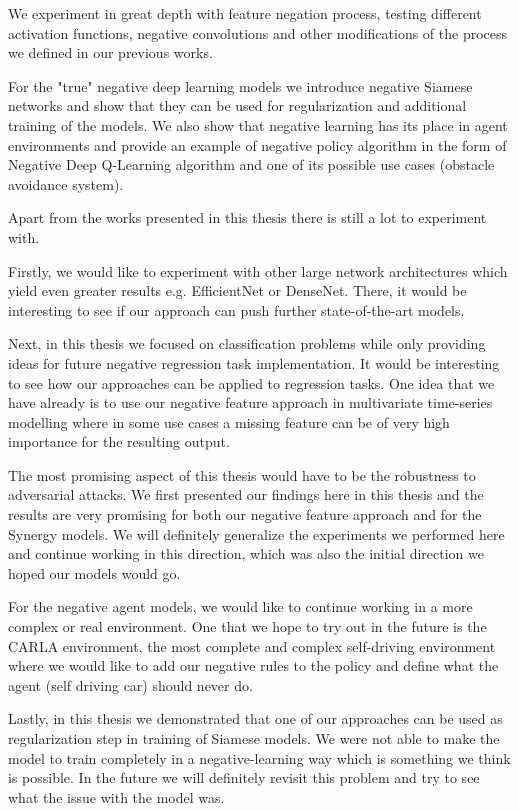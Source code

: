 \documentclass[b5paper]{book}
\begin{document}
We experiment in great depth with feature negation process, testing different activation functions, negative convolutions and other modifications of the process we defined in our previous works.

For the "true" negative deep learning models we introduce negative Siamese networks and show that they can be used for regularization and additional training of the models. We also show that negative learning has its place in agent environments and provide an example of negative policy algorithm in the form of Negative Deep Q-Learning algorithm and one of its possible use cases (obstacle avoidance system).

Apart from the works presented in this thesis there is still a lot to experiment with. 

Firstly, we would like to experiment with other large network architectures which yield even greater results e.g. EfficientNet or DenseNet. There, it would be interesting to see if our approach can push further state-of-the-art models.

Next, in this thesis we focused on classification problems while only providing ideas for future negative regression task implementation. It would be interesting to see how our approaches can be applied to regression tasks. One idea that we have already is to use our negative feature approach in multivariate time-series modelling where in some use cases a missing feature can be of very high importance for the resulting output.

The most promising aspect of this thesis would have to be the robustness to adversarial attacks. We first presented our findings here in this thesis and the results are very promising for both our negative feature approach and for the Synergy models. We will definitely generalize the experiments we performed here and continue working in this direction, which was also the initial direction we hoped our models would go.

For the negative agent models, we would like to continue working in a more complex or real environment. One that we hope to try out in the future is the CARLA environment, the most complete and complex self-driving environment where we would like to add our negative rules to the policy and define what the agent (self driving car) should never do.

Lastly, in this thesis we demonstrated that one of our approaches can be used as regularization step in training of Siamese models. We were not able to make the model to train completely in a negative-learning way which is something we think is possible. In the future we will definitely revisit this problem and try to see what the issue with the model was.
\end{document}
